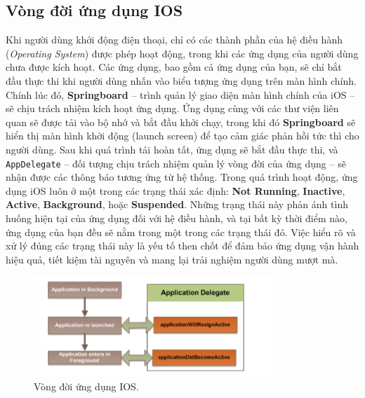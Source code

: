    \subsection{ Vòng đời ứng dụng IOS}	
        \begin{flushleft}
            \hspace*{0.8cm}Khi người dùng khởi động điện thoại, chỉ có các thành phần của hệ điều hành (\textit{Operating System}) được phép hoạt động, trong khi các ứng dụng của người dùng chưa được kích hoạt. Các ứng dụng, bao gồm cả ứng dụng của bạn, sẽ chỉ bắt đầu thực thi khi người dùng nhấn vào biểu tượng ứng dụng trên màn hình chính. Chính lúc đó, \textbf{Springboard} – trình quản lý giao diện màn hình chính của iOS – sẽ chịu trách nhiệm kích hoạt ứng dụng. Ứng dụng cùng với các thư viện liên quan sẽ được tải vào bộ nhớ và bắt đầu khởi chạy, trong khi đó \textbf{Springboard} sẽ hiển thị màn hình khởi động (launch screen) để tạo cảm giác phản hồi tức thì cho người dùng. Sau khi quá trình tải hoàn tất, ứng dụng sẽ bắt đầu thực thi, và \texttt{AppDelegate} – đối tượng chịu trách nhiệm quản lý vòng đời của ứng dụng 
            – sẽ nhận được các thông báo tương ứng từ hệ thống.
            Trong quá trình hoạt động, ứng dụng iOS luôn ở một trong các trạng thái xác định: \textbf{Not Running}, \textbf{Inactive}, \textbf{Active}, \textbf{Background}, hoặc \textbf{Suspended}. Những trạng thái này phản ánh tình huống hiện tại của ứng dụng đối với hệ điều hành, và tại bất kỳ thời điểm nào, ứng dụng của bạn đều sẽ nằm trong một trong các trạng thái đó. Việc hiểu rõ và xử lý đúng các trạng thái này là yếu tố then chốt để đảm bảo ứng dụng vận hành hiệu quả, tiết kiệm tài nguyên và mang lại trải nghiệm người dùng mượt mà.
            
        \end{flushleft}
        \begin{figure}[H] %
            \centering
            \includegraphics[width=0.8\textwidth]{images/vongdoiios.png}
             \caption{Vòng đời ứng dụng IOS\cite{life cycle-IOS}.} 
            \label{fig:vongdoiios}
        \end{figure}
